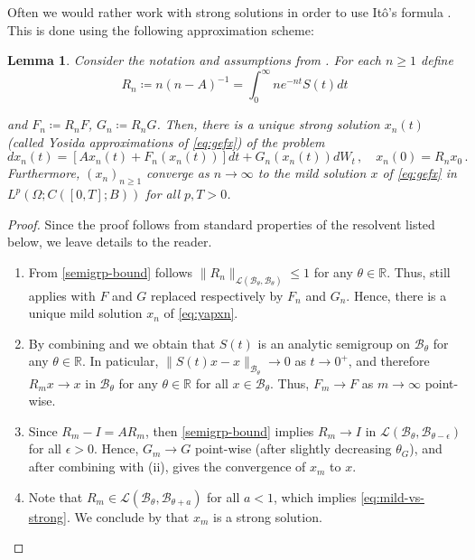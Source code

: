 \documentclass[final]{amsart}
\newtheorem{lem}[thm]{Lemma}
\numberwithin{thm}{section}
\numberwithin{equation}{section}
\newcommand{\R}{\mathbb{R}}
\newcommand{\Ll}{\mathcal{L}}
\newcommand{\B}{\mathcal{B}}
\begin{document}
Often we would rather work with strong solutions in order to use It\^{o}'s formula \cite[Theorem 2.4]{ito-formula}. This is done using the following approximation scheme:

\begin{lem}\label{def:yosida}
    Consider the notation and assumptions from . For each $n \geq 1$ define
    $$
    R_n \coloneqq n(n - A)^{-1} = \int_0^\infty ne^{-nt}S(t)dt 
    $$
    
    and $F_n \coloneqq R_nF$,  $G_n \coloneqq R_nG$. 
    Then, there is a unique strong solution $x_n(t)$ (called Yosida approximations of \eqref{eq:gefx})
    of the problem
    \begin{equation}\label{eq:yapxn}
    dx_n(t) = [Ax_n(t) + F_n(x_n(t))]dt + G_n(x_n(t))dW_t \,, \quad x_n(0) = R_n x_0 \,.
    \end{equation}
    Furthermore, $(x_n)_{n \geq 1}$ converge as $n \to \infty$ to the mild solution $x$
    of \eqref{eq:gefx} in $L^p(\Omega; C([0,T];B))$ for all $p,T > 0$.
\end{lem}

\begin{proof}
    Since the proof follows from  standard properties of the resolvent listed below, we leave details to the reader. 
    \begin{enumerate}[label = (\roman*)]
    
    \item From \eqref{semigrp-bound} follows $\|R_n\|_{\Ll(\B_\theta,\B_\theta)} \leq 1$ for any $\theta \in \R$. Thus,  still applies with $F$ and $G$ replaced respectively by $F_n$ and $G_n$. Hence, there is a unique mild  solution $x_n$ of \eqref{eq:yapxn}.
        
        \item By combining \cite[Exercise 5.42]{hairer-notes} 
        and \cite[Proposition 2.1.11]{lunardi}
        we obtain that $S(t)$ is an analytic semigroup on $\B_\theta$
        for any $\theta \in \R$. In paticular, $\|S(t)x - x\|_{\B_\theta} \to 0$ as $t \to 0^+$, and therefore 
         $R_mx \to x$ in $\B_\theta$ for any $\theta \in \R$ for all $x \in \B_\theta$. Thus, $F_m \to F$ as $m \to \infty$ point-wise.
        
         \item Since $R_m - I = AR_m$, then \eqref{semigrp-bound} implies $R_m \to I$ in $\Ll(\B_\theta,\B_{\theta-\epsilon})$ for all $\epsilon > 0$. Hence, $G_m \to G$ point-wise (after slightly decreasing $\theta_G$), and after combining with (ii),  gives the convergence of $x_m$ to $x$.  
        
        \item Note that $R_m \in \Ll(\B_{\theta},\B_{\theta+a})$ for all $a < 1$, which implies \eqref{eq:mild-vs-strong}. We conclude by  that $x_m$ is a strong solution.
    \end{enumerate}
\end{proof}
\end{document}
